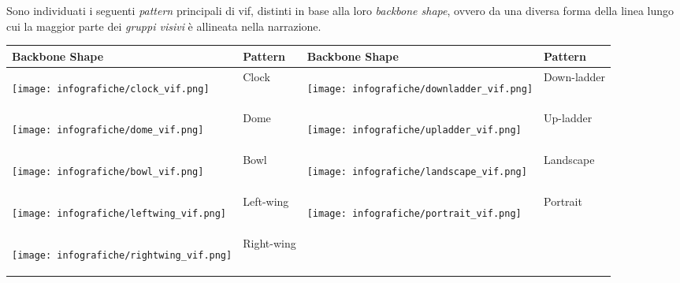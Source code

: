 Sono individuati i seguenti \emph{pattern} principali di \gls{vif}, distinti in base alla loro \emph{backbone shape}, ovvero da una diversa forma della linea lungo cui la 
maggior parte dei \emph{gruppi visivi} è allineata nella narrazione.
\begin{table}[H]
    \centering
    \begin{tabular}{|>{\centering\arraybackslash} m{}| >{\centering\arraybackslash} m{}| >{\centering\arraybackslash} m{}| >{\centering\arraybackslash} m{}|}
        \hline
        \rowcolor{gray!20}
        \textbf{Backbone Shape} & \textbf{Pattern} & \textbf{Backbone Shape} & \textbf{Pattern} \\
        \hline
        \begin{center}\texttt{[image: infografiche/clock\_vif.png]}\end{center} & Clock 
        & \begin{center}\texttt{[image: infografiche/downladder\_vif.png]}\end{center} & Down-ladder \\
        \begin{center}\texttt{[image: infografiche/dome\_vif.png]}\end{center} & Dome
        & \begin{center}\texttt{[image: infografiche/upladder\_vif.png]}\end{center} & Up-ladder \\
        \begin{center}\texttt{[image: infografiche/bowl\_vif.png]}\end{center} & Bowl
        & \begin{center}\texttt{[image: infografiche/landscape\_vif.png]}\end{center} & Landscape \\
        \begin{center}\texttt{[image: infografiche/leftwing\_vif.png]}\end{center} & Left-wing 
        & \begin{center}\texttt{[image: infografiche/portrait\_vif.png]}\end{center} & Portrait \\
        \begin{center}\texttt{[image: infografiche/rightwing\_vif.png]}\end{center} & Right-wing

\end{tabular}
\end{table}
